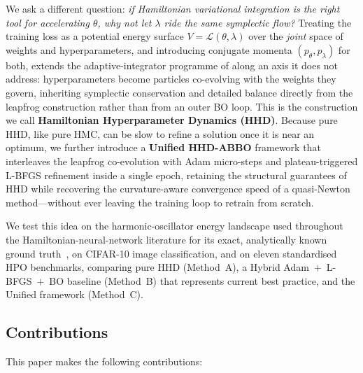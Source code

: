 \documentclass[11pt]{article}
\theoremstyle{definition}
\newcommand{\calL}{\mathcal{L}}
\begin{document}
We ask a different question: \emph{if Hamiltonian variational
integration is the right tool for accelerating $\theta$, why not let
$\lambda$ ride the same symplectic flow?} Treating the training loss
as a potential energy surface $V=\calL(\theta,\lambda)$ over the
\emph{joint} space of weights and hyperparameters, and introducing
conjugate momenta $(p_\theta,p_\lambda)$ for both, extends the
adaptive-integrator programme of \cite{duruisseaux2021adaptive} along
an axis it does not address: hyperparameters become particles
co-evolving with the weights they govern, inheriting symplectic
conservation and detailed balance directly from the leapfrog
construction rather than from an outer BO loop. This is the
construction we call \textbf{Hamiltonian Hyperparameter Dynamics
(HHD)}. Because pure HHD, like pure HMC, can be slow to refine a
solution once it is near an optimum, we further introduce a
\textbf{Unified HHD-ABBO} framework that interleaves the leapfrog
co-evolution with Adam micro-steps and plateau-triggered L-BFGS
refinement inside a single epoch, retaining the structural guarantees
of HHD while recovering the curvature-aware convergence speed of a
quasi-Newton method---without ever leaving the training loop to
retrain from scratch.

We test this idea on the harmonic-oscillator energy landscape used
throughout the Hamiltonian-neural-network literature for its exact,
analytically known ground truth~\cite{greydanus2019,zhang2025}, on
CIFAR-10 image classification, and on eleven standardised HPO
benchmarks, comparing pure HHD (Method~A), a Hybrid
Adam~$+$~L-BFGS~$+$~BO baseline (Method~B) that represents current
best practice, and the Unified framework (Method~C).

\subsection{Contributions}

This paper makes the following contributions:
\end{document}
